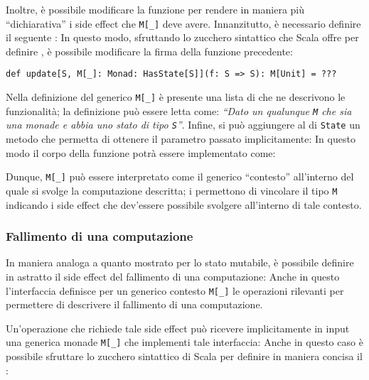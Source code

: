 Inoltre, è possibile modificare la funzione per rendere in maniera più ``dichiarativa'' i side effect che \lstinline{M[_]} deve avere. Innanzitutto, è necessario definire il seguente :
In questo modo, sfruttando lo zucchero sintattico che Scala offre per definire , è possibile modificare la firma della funzione precedente:
\begin{lstlisting}[language=scala3]
def update[S, M[_]: Monad: HasState[S]](f: S => S): M[Unit] = ???
\end{lstlisting}
Nella definizione del generico \lstinline{M[_]} è presente una lista di  che ne descrivono le funzionalità; la definizione può essere letta come: \emph{``Dato un qualunque \lstinline{M} che sia una monade e abbia uno stato di tipo \lstinline{S}''}.
Infine, si può aggiungere al  di \lstinline{State} un metodo che permetta di ottenere il parametro passato implicitamente:
In questo modo il corpo della funzione potrà essere implementato come:

Dunque, \lstinline{M[_]} può essere interpretato come il generico ``contesto'' all'interno del quale si svolge la computazione descritta; i  permettono di vincolare il tipo \lstinline{M} indicando i side effect che dev'essere possibile svolgere all'interno di tale contesto.

\subsubsection{Fallimento di una computazione}
In maniera analoga a quanto mostrato per lo stato mutabile, è possibile definire in astratto il side effect del fallimento di una computazione:
Anche in questo l'interfaccia definisce per un generico contesto \lstinline{M[_]} le operazioni rilevanti per permettere di descrivere il fallimento di una computazione.

Un'operazione che richiede tale side effect può ricevere implicitamente in input una generica monade \lstinline{M[_]} che implementi tale interfaccia:
Anche in questo caso è possibile sfruttare lo zucchero sintattico di Scala per definire in maniera concisa il :

